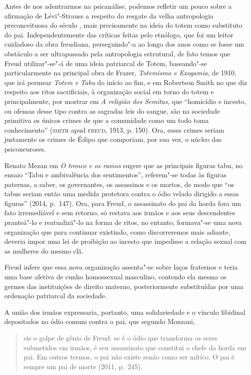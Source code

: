 Antes de nos adentrarmos na psicanálise, podemos refletir um pouco sobre
a afirmação de Lévi"-Strauss a respeito do resgate da velha antropologia
preconceituosa do século , mais precisamente na ideia do totem como
substituto do pai. Independentemente das críticas feitas pelo etnólogo,
que foi um leitor cuidadoso da obra freudiana, perseguindo"-a ao longo
dos anos como se fosse um obstáculo a ser ultrapassado pela antropologia
estrutural, de fato temos que Freud utilizar"-se"-á de uma ideia
patriarcal de Totem, baseando"-se particularmente na principal obra de
Frazer, \emph{Totemismo e Exogamia}, de 1910, que irá permear \emph{Totem e
Tabu} do início ao fim, e em Robertson Smith no que diz respeito aos
ritos sacrificiais, à organização social em torno do totem e
principalmente, por mostrar em \emph{A religião dos Semitas}, que
``homicídio e incesto, ou ofensas desse tipo contra as sagradas leis do
sangue, são na sociedade primitiva os únicos crimes de que a comunidade
como um todo toma conhecimento'' (\textsc{smith} apud \textsc{freud}, 1913, p. 150). Ora,
esses crimes seriam justamente os crimes de Édipo que comporiam, por sua
vez, o núcleo das psiconeuroses.

Renato Mezan em \emph{O tronco e os ramos} sugere que as
principais figuras tabu, no ensaio ``Tabu e ambivalência dos
sentimentos'', referem"-se todas às figuras paternas, a saber, os
governantes, os assassinos e os mortos, de modo que ``os tabus seriam
então uma medida protetora contra o ódio velado dirigido a essas
figuras'' (2014, p.~147). Ora, para Freud, o assassinato do pai
da horda fora um fato irremediável e sem retorno, só restava aos irmãos
e aos seus descendentes pranteá"-lo e reatualizá"-lo na forma de ritos, no
entanto, formava"-se uma nova organização que para continuar existindo,
como discorreremos mais adiante, deveria impor uma lei de proibição ao
incesto que impedisse a relação sexual com as mulheres do mesmo clã.

Freud infere que essa nova organização assenta"-se sobre laços fraternos
e teria uma base afetiva de cunho homossexual masculino, contendo ela
mesma os germes das instituições de direito materno, posteriormente
substituídas por uma ordenação patriarcal da sociedade.

A união dos irmãos expressaria, portanto, uma solidariedade e o vínculo
libidinal depositados no ódio comum contra o pai, que segundo Monzani,

\begin{quote}
eis o golpe de gênio de Freud: se é o ódio que transforma os seres
submetidos em irmãos, é seu assassinato que constitui o chefe da horda
em pai. Em outros termos, o pai não existe senão como ser mítico. O pai
é sempre um pai de morte (2011, p.~245).
\end{quote}


